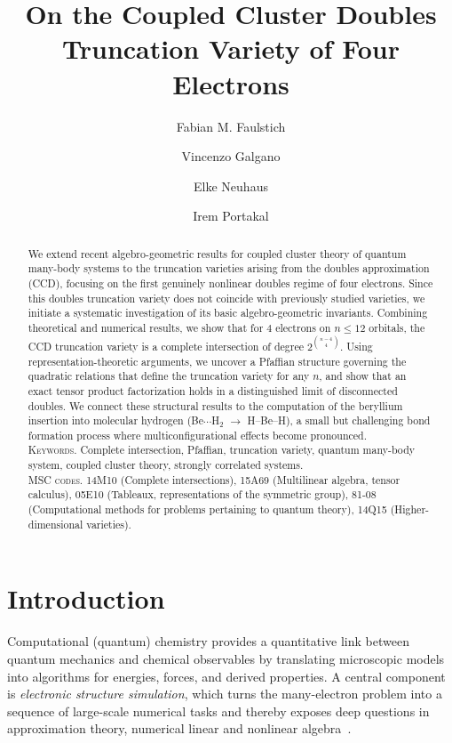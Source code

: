 \documentclass[11pt,reqno]{amsart}
\title[On the Coupled Cluster Doubles Truncation Variety of Four Electrons]{On the Coupled Cluster Doubles Truncation Variety of Four Electrons}
\author[F. M. Faulstich]{Fabian M. Faulstich}
\author[V. Galgano]{Vincenzo Galgano}
\author[E. Neuhaus]{Elke Neuhaus}
\author[I. Portakal]{Irem Portakal}
\theoremstyle{definition}
\numberwithin{theorem}{section}
\numberwithin{equation}{section}
\begin{document}
\begin{abstract}
We extend recent algebro-geometric results for coupled cluster theory of quantum many-body systems to the truncation varieties arising from the doubles approximation (CCD), focusing on the first genuinely nonlinear doubles regime of four electrons. Since this doubles truncation variety does not coincide with previously studied varieties, we initiate a systematic investigation of its basic algebro-geometric invariants. Combining theoretical and numerical results, we show that for $4$ electrons on $n\leq 12$ orbitals, the CCD truncation variety is a complete intersection of degree $2^{\binom{n-4}{4}}$. Using representation-theoretic arguments, we uncover a Pfaffian structure governing the quadratic relations that define the truncation variety for any $n$, and show that an exact tensor product factorization holds in a distinguished limit of disconnected doubles. We connect these structural results to the computation of the beryllium insertion into molecular hydrogen ({Be$\cdots$H$_2$ $\to$ H--Be--H}), a small but challenging bond formation process where multiconfigurational effects become pronounced. \\
\hfill\break
\textsc{Keywords.} Complete intersection, Pfaffian, truncation variety, quantum many-body system, coupled cluster theory, strongly correlated systems. \\
\hfill\break
\textsc{MSC codes.} 14M10 (Complete intersections), 15A69
(Multilinear algebra, tensor calculus), 05E10 (Tableaux, representations of the symmetric group), 81-08 (Computational methods for problems pertaining to quantum theory), 14Q15 (Higher-dimensional varieties).
\end{abstract}

\maketitle

\section{Introduction}

\noindent
Computational (quantum) chemistry provides a quantitative link between quantum mechanics and chemical observables by translating microscopic models into algorithms for energies, forces, and derived properties.  A central component is {\it electronic structure simulation}, which turns the many-electron problem into a sequence of large-scale numerical tasks and thereby exposes deep questions in approximation theory, numerical linear and nonlinear algebra~\cite{helgaker2014molecular}.
\end{document}
